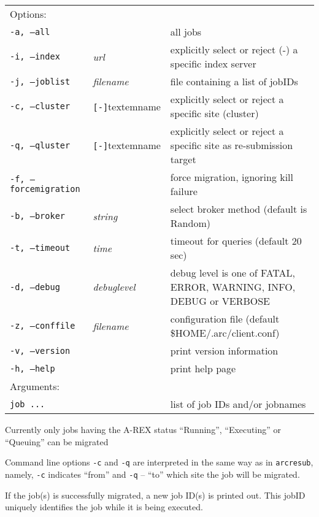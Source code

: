 \hspace*{0.5cm}
\begin{shaded}
\end{shaded}
\begin{longtable}{llp{8cm}}
   Options:&&\\
   \texttt{-a, --all}& & all jobs\\
   \texttt{-i, --index}&\textit{url}&explicitly select or reject (-) a specific index server\\
   \texttt{-j, --joblist}& \textit{filename} & file containing a list of jobIDs\\
   \texttt{-c, --cluster}&\verb#[-]#textem{name}&explicitly select or reject a specific site (cluster)\\
   \texttt{-q, --qluster}&\verb#[-]#textem{name}&explicitly select or reject a specific site as re-submission target\\
   \texttt{-f, --forcemigration}& & force migration, ignoring kill failure\\
   \texttt{-b, --broker}&\textit{string}&select broker method (default is Random)\\
   \texttt{-t, --timeout}& \textit{time} & timeout for queries (default 20 sec)\\
   \texttt{-d, --debug}& \textit{debuglevel}&debug level is one of  FATAL, ERROR, WARNING, INFO, DEBUG or VERBOSE\\
   \texttt{-z, --conffile}&\textit{filename}& configuration file (default {\$}HOME/.arc/client.conf)\\
   \texttt{-v, --version}& & print version information\\
   \texttt{-h, --help}& & print help page\\
   Arguments:&&\\
   \texttt{job ...} && list of job IDs and/or jobnames\\
\end{longtable}

\begin{framed}
Currently only jobs having the A-REX status ``Running'', ``Executing'' or ``Queuing'' can be migrated
\end{framed}

Command line options \verb#-c# and \verb #-q# are interpreted in the same way as in \verb#arcresub#, namely, 
\verb#-c# indicates ``from'' and \verb #-q# -- ``to'' which site the job will be migrated.

If the job(s) is successfully migrated, a new job ID(s) is printed out. This jobID uniquely 
identifies the job while it is being executed.